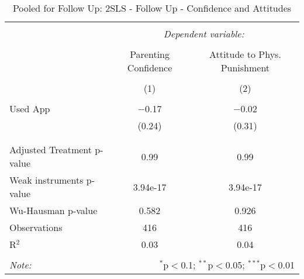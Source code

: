 
\begin{table}[!htbp] \centering 
  \caption{Pooled for Follow Up: 2SLS - Follow Up - Confidence and Attitudes} 
  \label{tbl:Pooled for Follow Up: 2SLS - Follow Up - Confidence and Attitudes} 
\begin{tabular}{@{\extracolsep{5pt}}lcc} 
\\[-1.8ex]\hline 
\hline \\[-1.8ex] 
 & \multicolumn{2}{c}{\textit{Dependent variable:}} \\ 
\cline{2-3} 
\\[-1.8ex] & Parenting Confidence & Attitude to Phys. Punishment \\ 
\\[-1.8ex] & (1) & (2)\\ 
\hline \\[-1.8ex] 
 Used App & $-$0.17 & $-$0.02 \\ 
  & (0.24) & (0.31) \\ 
  & & \\ 
\hline \\[-1.8ex] 
Adjusted Treatment p-value & 0.99 & 0.99 \\ 
Weak instruments p-value & 3.94e-17 & 3.94e-17 \\ 
Wu-Hausman p-value & 0.582 & 0.926 \\ 
Observations & 416 & 416 \\ 
R$^{2}$ & 0.03 & 0.04 \\ 
\hline 
\hline \\[-1.8ex] 
\textit{Note:}  & \multicolumn{2}{r}{$^{*}$p$<$0.1; $^{**}$p$<$0.05; $^{***}$p$<$0.01} \\ 
\end{tabular} 
\end{table} 

